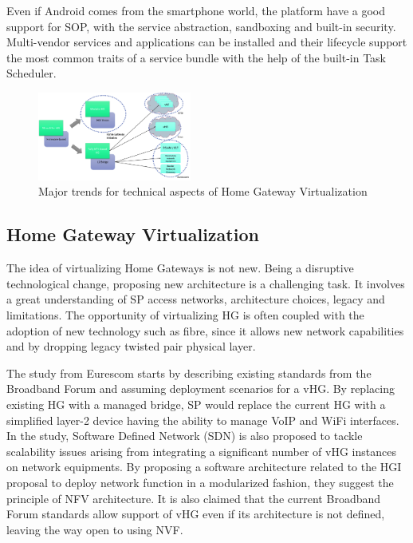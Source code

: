 Even if Android comes from the smartphone world, the platform have a good support for SOP, with the service abstraction, sandboxing and built-in security. Multi-vendor services and applications can be installed and their lifecycle support the most common traits of a service bundle with the help of the built-in Task Scheduler.


\begin{figure}
  \begin{center}
    \includegraphics[width=0.45\textwidth,natwidth=6000,natheight=4000]{fig/vhgtrends.png}
  \end{center}
  \caption{ Major trends for technical aspects of Home Gateway Virtualization
    \label{fig:trends}
  }
\end{figure}


\subsection{Home Gateway Virtualization}
The idea of virtualizing Home Gateways is not new.
Being a disruptive technological change, proposing new architecture is a challenging task.
It involves a great understanding of SP access networks, architecture choices, legacy and limitations.
The opportunity of virtualizing HG is often coupled with the adoption of new technology such as fibre, since it allows new network capabilities and by dropping legacy twisted pair physical layer.

The study from Eurescom \cite{daniel_abgrall_virtual_????} starts by describing existing standards from the Broadband Forum and assuming deployment scenarios for a vHG.
By replacing existing HG with a managed bridge, SP would replace the current HG with a simplified layer-2 device having the ability to manage VoIP and WiFi interfaces.
In the study, Software Defined Network (SDN) is also proposed to tackle scalability issues arising from integrating a significant number of vHG instances on network equipments.
By proposing a software architecture related to the HGI proposal to deploy network function in a modularized fashion, they suggest the principle of NFV architecture.
It is also claimed that the current Broadband Forum standards allow support of vHG even if its architecture is not defined, leaving the way open to using NVF.

